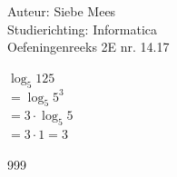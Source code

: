 \documentclass[a4paper]{article}
\begin{document}
  
\noindent \large Auteur: Siebe Mees \\
\noindent \large Studierichting: Informatica \\
\noindent \large Oefeningenreeks 2E nr. 14.17 \\

\medskip

\normalsize

$ \log_5 125 $ \\

$ = \log_5  5^3 $ \\

$ = 3 \cdot \log_5 5 $\\

$ = 3 \cdot 1 = 3 $\\


\begin{thebibliography}{999}
\end{thebibliography}
\end{document}
